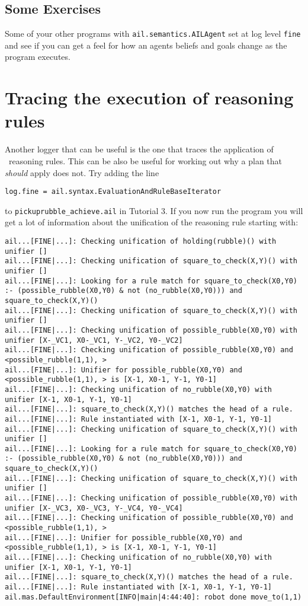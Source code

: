 \subsection{Some Exercises}
Some of your other programs with \texttt{ail.semantics.AILAgent} set at log level \texttt{fine} and see if you can get a feel for how an agents beliefs and goals change as the program executes.

\section{Tracing the execution of reasoning rules}
Another logger that can be useful is the one that traces the application of \prolog\ reasoning rules.  This can be also be useful for working out why a plan that \emph{should} apply does not.  Try adding the line
\begin{verbatim}
log.fine = ail.syntax.EvaluationAndRuleBaseIterator
\end{verbatim}
to \texttt{pickuprubble\_achieve.ail} in Tutorial 3.  If you now run the program you will get a lot of information about the unification of the reasoning rule starting with:

\begin{small}
\begin{verbatim}
ail...[FINE|...]: Checking unification of holding(rubble)() with unifier [] 
ail...[FINE|...]: Checking unification of square_to_check(X,Y)() with unifier [] 
ail...[FINE|...]: Looking for a rule match for square_to_check(X0,Y0) :- (possible_rubble(X0,Y0) & not (no_rubble(X0,Y0))) and square_to_check(X,Y)() 
ail...[FINE|...]: Checking unification of square_to_check(X,Y)() with unifier [] 
ail...[FINE|...]: Checking unification of possible_rubble(X0,Y0) with unifier [X-_VC1, X0-_VC1, Y-_VC2, Y0-_VC2] 
ail...[FINE|...]: Checking unification of possible_rubble(X0,Y0) and <possible_rubble(1,1), > 
ail...[FINE|...]: Unifier for possible_rubble(X0,Y0) and <possible_rubble(1,1), > is [X-1, X0-1, Y-1, Y0-1] 
ail...[FINE|...]: Checking unification of no_rubble(X0,Y0) with unifier [X-1, X0-1, Y-1, Y0-1] 
ail...[FINE|...]: square_to_check(X,Y)() matches the head of a rule. 
ail...[FINE|...]: Rule instantiated with [X-1, X0-1, Y-1, Y0-1] 
ail...[FINE|...]: Checking unification of square_to_check(X,Y)() with unifier [] 
ail...[FINE|...]: Looking for a rule match for square_to_check(X0,Y0) :- (possible_rubble(X0,Y0) & not (no_rubble(X0,Y0))) and square_to_check(X,Y)() 
ail...[FINE|...]: Checking unification of square_to_check(X,Y)() with unifier [] 
ail...[FINE|...]: Checking unification of possible_rubble(X0,Y0) with unifier [X-_VC3, X0-_VC3, Y-_VC4, Y0-_VC4] 
ail...[FINE|...]: Checking unification of possible_rubble(X0,Y0) and <possible_rubble(1,1), > 
ail...[FINE|...]: Unifier for possible_rubble(X0,Y0) and <possible_rubble(1,1), > is [X-1, X0-1, Y-1, Y0-1] 
ail...[FINE|...]: Checking unification of no_rubble(X0,Y0) with unifier [X-1, X0-1, Y-1, Y0-1] 
ail...[FINE|...]: square_to_check(X,Y)() matches the head of a rule. 
ail...[FINE|...]: Rule instantiated with [X-1, X0-1, Y-1, Y0-1] 
ail.mas.DefaultEnvironment[INFO|main|4:44:40]: robot done move_to(1,1) 
\end{verbatim}
\end{small}


